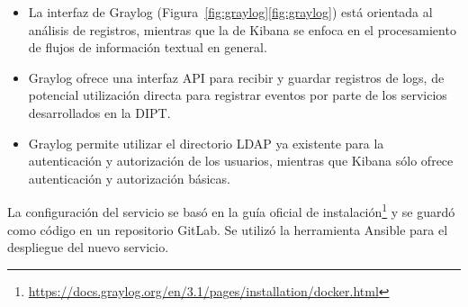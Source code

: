 \begin{itemize}
\item La interfaz de Graylog
  (\iflatexml{}Figura~\ref{fig:graylog}\else\autoref{fig:graylog}\fi{})
  está orientada al análisis de registros,
  mientras que la de Kibana se enfoca en el procesamiento de flujos de
  información textual en general.
\item Graylog ofrece una interfaz API para recibir y guardar registros
  de logs, de potencial utilización directa para registrar eventos por
  parte de los servicios desarrollados en la DIPT.
\item Graylog permite utilizar el directorio LDAP ya existente para la
  autenticación y autorización de los usuarios, mientras que Kibana
  sólo ofrece autenticación y autorización básicas.
\end{itemize}
La configuración del servicio se basó en la guía oficial de
instalación\footnote{
  \href{https://docs.graylog.org/en/3.1/pages/installation/docker.html}{https://docs.graylog.org/en/3.1/pages/installation/docker.html}
} y se guardó como código en un repositorio GitLab. Se utilizó la
herramienta Ansible para el despliegue del nuevo servicio.
